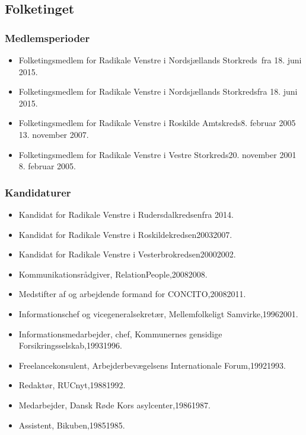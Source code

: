 \documentclass[11pt, a4paper]{awesome-cv}
\begin{document}
\begin{cvletter}
\subsection*{Folketinget}
\subsubsection*{Medlemsperioder}
\begin{itemize}
\item Folketingsmedlem for Radikale Venstre i Nordsjællands Storkreds fra 18. juni 2015.
\item Folketingsmedlem for Radikale Venstre i Nordsjællands Storkredsfra 18. juni 2015.
\item Folketingsmedlem for Radikale Venstre i Roskilde Amtskreds8. februar 2005  13. november 2007.
\item Folketingsmedlem for Radikale Venstre i Vestre Storkreds20. november 2001  8. februar 2005.
\end{itemize}
\subsubsection*{Kandidaturer}
\begin{itemize}
\item Kandidat for Radikale Venstre i Rudersdalkredsenfra 2014.
\item Kandidat for Radikale Venstre i Roskildekredsen20032007.
\item Kandidat for Radikale Venstre i Vesterbrokredsen20002002.
\end{itemize}
\begin{itemize}
\item Kommunikationsrådgiver, RelationPeople,20082008.
\item Medstifter af og arbejdende formand for CONCITO,20082011.
\item Informationschef og vicegeneralsekretær, Mellemfolkeligt Samvirke,19962001.
\item Informationsmedarbejder, chef, Kommunernes gensidige Forsikringsselskab,19931996.
\item Freelancekonsulent, Arbejderbevægelsens Internationale Forum,19921993.
\item Redaktør, RUCnyt,19881992.
\item Medarbejder, Dansk Røde Kors asylcenter,19861987.
\item Assistent, Bikuben,19851985.
\end{itemize}
\end{cvletter}
\end{document}
